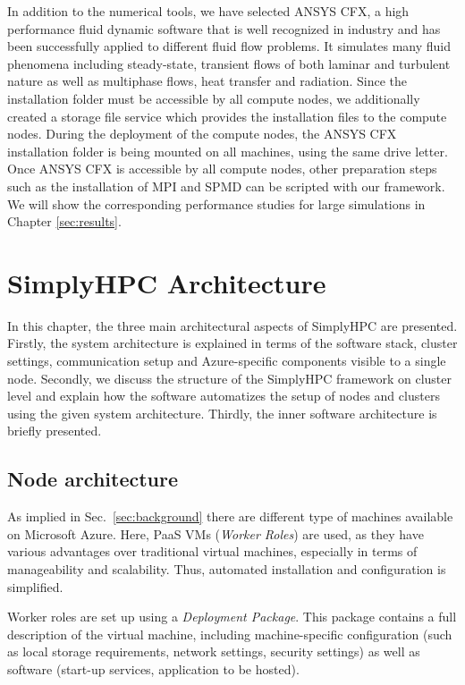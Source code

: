 \documentclass[3p,times]{elsarticle}
\begin{document}
In addition to the numerical tools, we have selected ANSYS CFX, a high performance fluid dynamic software that is well recognized in industry and has been successfully applied to different fluid flow problems. It simulates many fluid phenomena including steady-state, transient flows of both laminar and turbulent nature as well as multiphase flows, heat transfer and radiation. Since the installation folder must be accessible by all compute nodes, we additionally created a storage file service which provides the installation files to the compute nodes. During the deployment of the compute nodes, the ANSYS CFX installation folder is being mounted on all machines, using the same drive letter. Once ANSYS CFX is accessible by all compute nodes, other preparation steps such as the installation of MPI and SPMD can be scripted with our framework. We will show the corresponding performance studies for large simulations in Chapter \ref{sec:results}.

\section{SimplyHPC Architecture}
\label{sec:architecture}
In this chapter, the three main architectural aspects of SimplyHPC are presented. Firstly, the system architecture is explained in terms of the software stack, cluster settings, communication setup and Azure-specific components visible to a single node. Secondly, we discuss the structure of the SimplyHPC framework on cluster level and explain how the software automatizes the setup of nodes and clusters using the given system architecture. Thirdly, the inner software architecture is briefly presented.

\subsection{Node architecture}

As implied in Sec.~\ref{sec:background} there are different type of machines available on Microsoft Azure. Here, PaaS VMs (\textit{Worker Roles}) are used, as they have various advantages over traditional virtual machines, especially in terms of manageability and scalability. Thus, automated installation and configuration is simplified. 

Worker roles are set up using a \textit{Deployment Package}. This package contains a full description of the  virtual machine, including machine-specific configuration (such as local storage requirements, network settings, security settings) as well as software (start-up services, application to be hosted).
\end{document}
